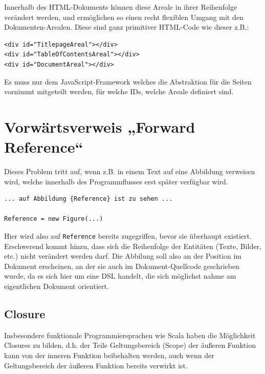 Innerhalb des HTML-Dokuments können diese Areale in ihrer Reihenfolge
verändert werden, und ermöglichen so einen recht flexiblen Umgang mit
den Doku\-men\-ten-Arealen. Diese sind ganz primitiver HTML-Code wie dieser
z.B.:

\begin{verbatim}
<div id="TitlepageAreal"></div>
<div id="TableOfContentsAreal"></div>
<div id="DocumentAreal"></div>
\end{verbatim}

Es muss nur dem JavaScript-Framework welches die Abstraktion für die
Seiten vornimmt mitgeteilt werden, für welche IDs, welche Areale definiert
sind.



\section{Vorwärtsverweis „Forward Reference“}\label{sec-forwardreference}

Dieses Problem tritt auf, wenn z.B. in einem Text auf eine Abbildung
verweisen wird, welche innerhalb des Programmflusses erst später verfügbar
wird.

\begin{lstlisting}
... auf Abbildung {Reference} ist zu sehen ...

Reference = new Figure(...)
\end{lstlisting}

Hier wird also auf \lstinline|Reference| bereits zugegriffen,
bevor sie überhaupt existiert. Erschwerend kommt hinzu, dass sich die
Reihenfolge der Entitäten (Texte, Bilder, etc.) nicht verändert werden darf.
Die Abbilung soll also an der Position im Dokument erscheinen, an der sie
auch im Dokument-Quellcode geschrieben wurde, da es sich hier um eine DSL
handelt, die sich möglichst nahme am eigentlichen Dokument orientiert.



\subsection{Closure}

Insbesondere funktionale Programmiersprachen wie Scala haben die
Möglichkeit Closures zu bilden, d.h. der Teile Geltungsbereich (Scope)
der äußeren Funktion  kann von der inneren Funktion beibehalten werden,
auch wenn der Geltungsbereich der äußeren Funktion bereits verwirkt ist.

